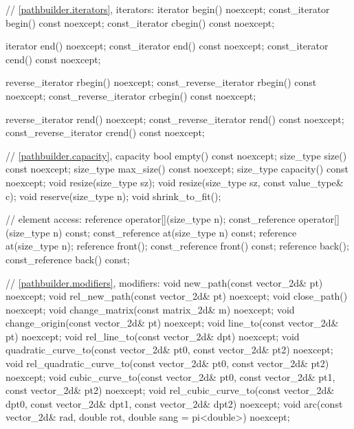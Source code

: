 \begin{codeblock}
{{    // \ref{pathbuilder.iterators}, iterators:
    iterator begin() noexcept;
    const_iterator begin() const noexcept;
    const_iterator cbegin() const noexcept;

    iterator end() noexcept;
    const_iterator end() const noexcept;
    const_iterator cend() const noexcept;
    
    reverse_iterator rbegin() noexcept;
    const_reverse_iterator rbegin() const noexcept;
    const_reverse_iterator crbegin() const noexcept;

    reverse_iterator rend() noexcept;
    const_reverse_iterator rend() const noexcept;
    const_reverse_iterator crend() const noexcept;
    
    // \ref{pathbuilder.capacity}, capacity
    bool empty() const noexcept;
    size_type size() const noexcept;
    size_type max_size() const noexcept;
    size_type capacity() const noexcept;
    void resize(size_type sz);
    void resize(size_type sz, const value_type& c);
    void reserve(size_type n);
    void shrink_to_fit();

    // element access:
    reference operator[](size_type n);
    const_reference operator[](size_type n) const;
    const_reference at(size_type n) const;
    reference at(size_type n);
    reference front();
    const_reference front() const;
    reference back();
    const_reference back() const;

    // \ref{pathbuilder.modifiers}, modifiers:
    void new_path(const vector_2d& pt) noexcept;
    void rel_new_path(const vector_2d& pt) noexcept;
    void close_path() noexcept;
    void change_matrix(const matrix_2d& m) noexcept;
    void change_origin(const vector_2d& pt) noexcept;
    void line_to(const vector_2d& pt) noexcept;
    void rel_line_to(const vector_2d& dpt) noexcept;
    void quadratic_curve_to(const vector_2d& pt0, const vector_2d& pt2)
      noexcept;
    void rel_quadratic_curve_to(const vector_2d& pt0, const vector_2d& pt2)
      noexcept;
    void cubic_curve_to(const vector_2d& pt0, const vector_2d& pt1,
      const vector_2d& pt2) noexcept;
    void rel_cubic_curve_to(const vector_2d& dpt0, const vector_2d& dpt1,
      const vector_2d& dpt2) noexcept;
    void arc(const vector_2d& rad, double rot, double sang = pi<double>)
      noexcept;
    
}}
\end{codeblock}
